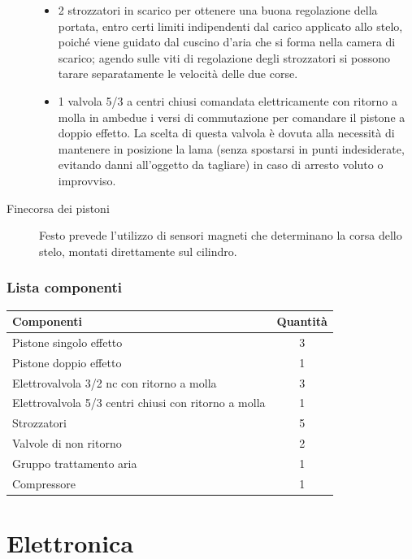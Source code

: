 \documentclass{report}
\begin{document}
\begin{description}
\begin{itemize}
  \item 2 strozzatori in scarico per ottenere una buona regolazione della portata, entro certi limiti indipendenti dal carico applicato allo stelo, poiché viene guidato dal cuscino d’aria che si forma nella camera di scarico; agendo sulle viti di regolazione degli strozzatori si possono tarare separatamente le velocità delle due corse.
  \item 1 valvola 5/3 a centri chiusi comandata elettricamente con ritorno a molla in ambedue i versi di commutazione per comandare il pistone a doppio effetto. La scelta di questa valvola è dovuta alla necessità di mantenere in posizione la lama (senza spostarsi in punti indesiderate, evitando danni all’oggetto da tagliare) in caso di arresto voluto o improvviso.
  \end{itemize}

\item[Finecorsa dei pistoni] Festo prevede l’utilizzo di sensori magneti che determinano la corsa dello stelo, montati direttamente sul cilindro.
\end{description}

\subsection{Lista componenti}
\begin{table}[H]
\centering
\begin{tabular}{|l|c|}
  \hline
  {\textbf{Componenti}} & \textbf{Quantità} \\ \hline
  Pistone singolo effetto & 3 \\ \hline
  Pistone doppio effetto & 1 \\ \hline
  Elettrovalvola 3/2 nc con ritorno a molla & 3 \\ \hline
  Elettrovalvola 5/3 centri chiusi con ritorno a molla & 1 \\ \hline
  Strozzatori & 5 \\ \hline
  Valvole di non ritorno & 2 \\ \hline
  Gruppo trattamento aria & 1 \\ \hline
  Compressore & 1 \\ \hline
\end{tabular}
\end{table}

\chapter{Elettronica}
\end{document}
